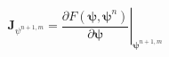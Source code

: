 \begin{equation}
\label{eq:richards-newton-deriv-setup}
\mathbf{J}_{\psi^{n+1,m}}  = \left. {\frac {\partial F(\boldsymbol{\psi},\boldsymbol{\psi}^n)}{\partial \boldsymbol{\psi}}} \right|_{\boldsymbol{\psi}^{n+1,m}}
\end{equation}
